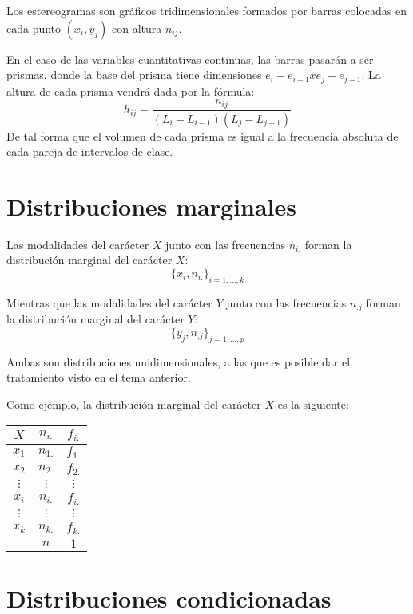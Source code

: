 Los estereogramas son gráficos tridimensionales formados por barras colocadas en cada punto $(x_i, y_j)$ con altura
$n_{ij}$.

En el caso de las variables cuantitativas continuas, las barras pasarán a ser prismas, donde la base del prisma
tiene dimensiones $e_i - e_{i-1} x e_j - e_{j-1}$. La altura de cada prisma vendrá dada por la fórmula:
$$h_{ij} = \dfrac{n_{ij}}{(L_i - L_{i-1})(L_j - L_{j-1})}$$
De tal forma que el volumen de cada prisma es igual a la frecuencia absoluta de cada pareja de intervalos de clase.

\section{Distribuciones marginales}

Las modalidades del carácter $X$ junto con las frecuencias $n_{i.}$ forman la distribución marginal del carácter $X$:
$$\{x_i, n_{i.}\}_{i=1,\ldots,k}$$

Mientras que las modalidades del carácter $Y$ junto con las frecuencias $n_{.j}$
forman la distribución marginal del carácter $Y$: $$\{y_j, n_{.j}\}_{j=1,\ldots,p}$$

Ambas son distribuciones unidimensionales, a las que es posible dar el tratamiento visto en el tema anterior.

Como ejemplo, la distribución marginal del carácter $X$ es la siguiente:
\begin{center}
    \begin{tabular}{c|c|c}
        $X$      & $n_{i.}$ & $f_{i.}$ \\
        \hline
        $x_1$    & $n_{1.}$ & $f_{1.}$ \\
        \hline
        $x_2$    & $n_{2.}$ & $f_{2.}$ \\
        \hline
        $\vdots$ & $\vdots$ & $\vdots$ \\
        \hline
        $x_i$    & $n_{i.}$ & $f_{i.}$ \\
        \hline
        $\vdots$ & $\vdots$ & $\vdots$ \\
        \hline
        $x_k$    & $n_{k.}$ & $f_{k.}$ \\
        \hline
                 & $n$        & $1$
    \end{tabular}
\end{center}

\section{Distribuciones condicionadas}

